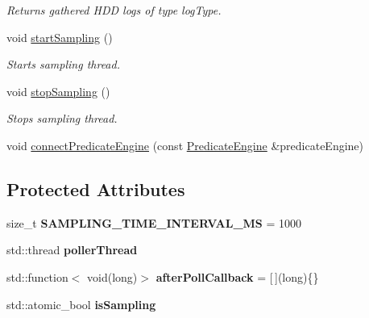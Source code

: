 \begin{DoxyCompactItemize}
\begin{DoxyCompactList}\small\item\em Returns gathered H\+DD logs of type \textquotesingle{}log\+Type\textquotesingle{}. \end{DoxyCompactList}\item 
void \hyperlink{classSamplingManager_a5b90987110e266b5c01c72f083b90cde}{start\+Sampling} ()\hypertarget{classSamplingManager_a5b90987110e266b5c01c72f083b90cde}{}\label{classSamplingManager_a5b90987110e266b5c01c72f083b90cde}

\begin{DoxyCompactList}\small\item\em Starts sampling thread. \end{DoxyCompactList}\item 
void \hyperlink{classSamplingManager_a59c818cff3d8eac0024e75b5a8628f1a}{stop\+Sampling} ()\hypertarget{classSamplingManager_a59c818cff3d8eac0024e75b5a8628f1a}{}\label{classSamplingManager_a59c818cff3d8eac0024e75b5a8628f1a}

\begin{DoxyCompactList}\small\item\em Stops sampling thread. \end{DoxyCompactList}\item 
void \hyperlink{classSamplingManager_ad522fa0406f0d6361d438ce0780f3647}{connect\+Predicate\+Engine} (const \hyperlink{classPredicateEngine}{Predicate\+Engine} \&predicate\+Engine)
\end{DoxyCompactItemize}
\subsection*{Protected Attributes}
\begin{DoxyCompactItemize}
\item 
size\+\_\+t {\bfseries S\+A\+M\+P\+L\+I\+N\+G\+\_\+\+T\+I\+M\+E\+\_\+\+I\+N\+T\+E\+R\+V\+A\+L\+\_\+\+MS} = 1000\hypertarget{classSamplingManager_ae8d9cfef7caf622c85a630332d7b2119}{}\label{classSamplingManager_ae8d9cfef7caf622c85a630332d7b2119}

\item 
std\+::thread {\bfseries poller\+Thread}\hypertarget{classSamplingManager_a7145b90de1b69981cff4e9f94e2e5df2}{}\label{classSamplingManager_a7145b90de1b69981cff4e9f94e2e5df2}

\item 
std\+::function$<$ void(long)$>$ {\bfseries after\+Poll\+Callback} = \mbox{[}$\,$\mbox{]}(long)\{\}\hypertarget{classSamplingManager_a0720092f8e98c9a543d4d1766f955459}{}\label{classSamplingManager_a0720092f8e98c9a543d4d1766f955459}

\item 
std\+::atomic\+\_\+bool {\bfseries is\+Sampling}\hypertarget{classSamplingManager_a10b44c6111987e15993fa386d0ab1367}{}\label{classSamplingManager_a10b44c6111987e15993fa386d0ab1367}

\end{DoxyCompactItemize}


